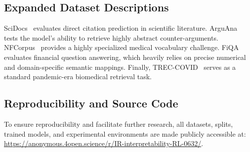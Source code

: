 \subsection{Expanded Dataset Descriptions}
SciDocs~\citep{cohan2020} evaluates direct citation prediction in scientific literature. ArguAna~\citep{wachsmuth2018} tests the model's ability to retrieve highly abstract counter-arguments. NFCorpus~\citep{boteva2016} provides a highly specialized medical vocabulary challenge. FiQA~\citep{maia2018} evaluates financial question answering, which heavily relies on precise numerical and domain-specific semantic mappings. Finally, TREC-COVID~\citep{voorhees2021} serves as a standard pandemic-era biomedical retrieval task.

\subsection{Reproducibility and Source Code}
To ensure reproducibility and facilitate further research, all datasets, splits, trained models, and experimental environments are made publicly accessible at: \url{https://anonymous.4open.science/r/IR-interpretability-RL-0632/}.


